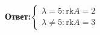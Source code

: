 \documentclass[a4paper]{article}
\newcommand{\case}[1]{\begin{cases} #1 \end{cases}}
\begin{document}
\begin{enumerate}
    \textbf{Ответ:}$\case{\lambda = 5: \text{rk}A = 2\\
    \lambda \neq 5: \text{rk}A = 3}$

\end{enumerate}
\end{document}
